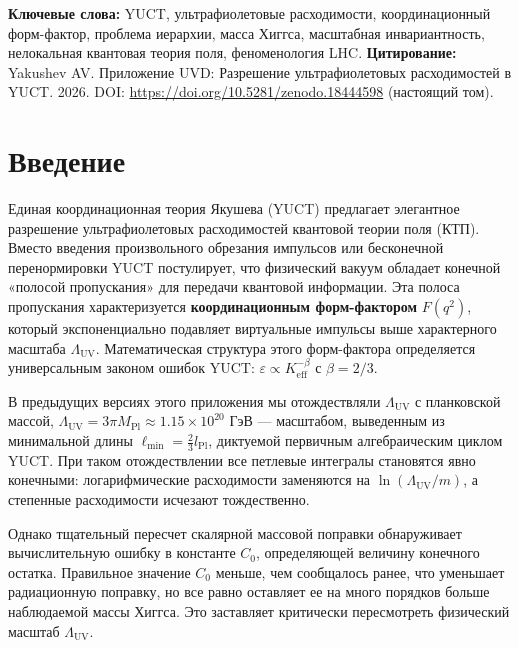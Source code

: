 \documentclass[11pt,a4paper]{article}
\newcommand{\Mpl}{M_{\mathrm{Pl}}}
\newcommand{\Lpl}{l_{\mathrm{Pl}}}
\newcommand{\Lmin}{\ell_{\min}}
\newcommand{\LUV}{\Lambda_{\mathrm{UV}}}
\theoremstyle{remark}
\begin{document}
	\vspace{0.2cm}
	\noindent
	{\color{darkblue}\textbf{Ключевые слова:}} YUCT, ультрафиолетовые расходимости, координационный форм-фактор, проблема иерархии, масса Хиггса, масштабная инвариантность, нелокальная квантовая теория поля, феноменология LHC.
	\vspace{0.1cm}
	\noindent
	{\color{darkblue}\textbf{Цитирование:}} Yakushev AV. Приложение UVD: Разрешение ультрафиолетовых расходимостей в YUCT. 2026. DOI: \url{https://doi.org/10.5281/zenodo.18444598} (настоящий том).
	
	\vspace{0.5cm}
	
	\section{Введение}
	\label{sec:intro}
	
	Единая координационная теория Якушева (YUCT) предлагает элегантное разрешение ультрафиолетовых расходимостей квантовой теории поля (КТП). Вместо введения произвольного обрезания импульсов или бесконечной перенормировки YUCT постулирует, что физический вакуум обладает конечной «полосой пропускания» для передачи квантовой информации. Эта полоса пропускания характеризуется \textbf{координационным форм-фактором} \(F(q^2)\), который экспоненциально подавляет виртуальные импульсы выше характерного масштаба \(\LUV\). Математическая структура этого форм-фактора определяется универсальным законом ошибок YUCT: \(\varepsilon \propto K_{\mathrm{eff}}^{-\beta}\) с \(\beta = 2/3\).
	
	В предыдущих версиях этого приложения мы отождествляли \(\LUV\) с планковской массой, \(\LUV = 3\pi\Mpl \approx 1.15\times 10^{20}\) ГэВ — масштабом, выведенным из минимальной длины \(\Lmin = \frac{2}{3}\Lpl\), диктуемой первичным алгебраическим циклом YUCT. При таком отождествлении все петлевые интегралы становятся явно конечными: логарифмические расходимости заменяются на \(\ln(\LUV/m)\), а степенные расходимости исчезают тождественно.
	
	Однако тщательный пересчет скалярной массовой поправки обнаруживает вычислительную ошибку в константе \(C_0\), определяющей величину конечного остатка. Правильное значение \(C_0\) меньше, чем сообщалось ранее, что уменьшает радиационную поправку, но все равно оставляет ее на много порядков больше наблюдаемой массы Хиггса. Это заставляет критически пересмотреть физический масштаб \(\LUV\).
	
\end{document}
